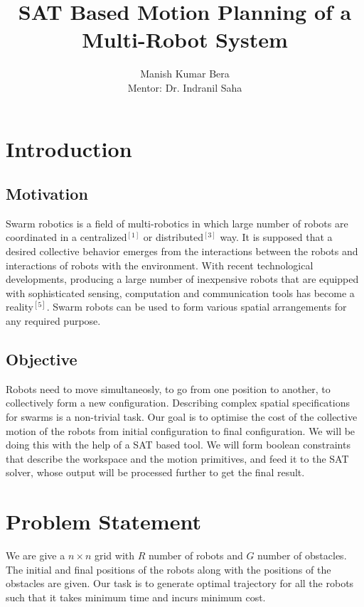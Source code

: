 \documentclass{article}[11pt]
\title{SAT Based Motion Planning of a Multi-Robot System}
\author{Manish Kumar Bera \\
Mentor: Dr. Indranil Saha
}
\begin{document}
	\maketitle

	\section{Introduction}
		\subsection{Motivation}
		Swarm robotics is a field of multi-robotics in which large number of robots are coordinated in a centralized$^{[1]}$ or distributed$^{[3]}$ way.
		It is supposed that a desired collective behavior emerges from the interactions between the robots and interactions of robots with the environment.
		With  recent  technological  developments, producing a large number of inexpensive robots that are  equipped  with  sophisticated  sensing,  computation and communication tools has become a reality$^{[5]}$. 
		Swarm robots can be used to form various spatial arrangements for any required purpose.
		\subsection{Objective}
		Robots need to move simultaneosly, to go from one position to another, to collectively
		form a new configuration. Describing complex spatial specifications for swarms is a
		non-trivial task. Our goal is to optimise the cost of the collective motion of the robots
		from initial configuration to final configuration. We will be doing this with the help
		of a SAT based tool. We will form boolean constraints that describe the workspace and the
		motion primitives, and feed it to the SAT solver, whose output will be processed further
		to get the final result.




	\section{Problem Statement}
		We are give a $n \times n$ grid with $R$ number of robots and $G$ number of obstacles. The initial and final positions of the robots along with the positions of the obstacles are given. Our task is to generate optimal trajectory for all the robots such that it takes minimum time and incurs minimum cost. 
\end{document}
